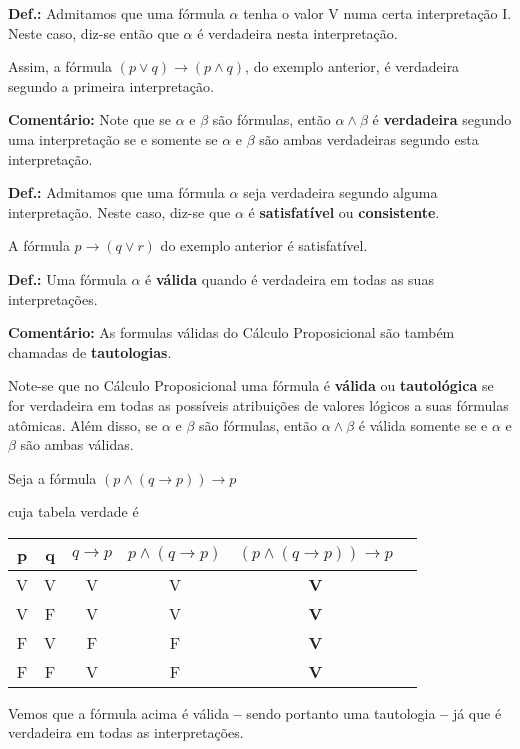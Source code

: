 \bigskip
\noindent
\textbf{Def.:} Admitamos que uma fórmula $\alpha$ tenha o valor V numa certa interpretação I.
Neste caso, diz-se então que $\alpha$ é verdadeira nesta interpretação.

Assim, a fórmula $(p \lor q) \to (p \land q)$, do exemplo anterior, é verdadeira segundo a primeira interpretação.

\bigskip
\noindent
\textbf{Comentário:} Note que se $\alpha$ e $\beta$ são fórmulas, então $\alpha \land \beta$ é \textbf{verdadeira} segundo uma interpretação se e somente se $\alpha$ e $\beta$ são ambas verdadeiras segundo esta interpretação.

\bigskip
\noindent
\textbf{Def.:} Admitamos que uma fórmula $\alpha$ seja verdadeira segundo alguma interpretação.
Neste caso, diz-se que $\alpha$ é \textbf{satisfatível} ou \textbf{consistente}.

A fórmula $p \to (q \lor r)$ do exemplo anterior é satisfatível.


\bigskip
\noindent
\textbf{Def.:} Uma fórmula $\alpha$ é \textbf{válida} quando é verdadeira em todas as suas interpretações.

\bigskip
\noindent
\textbf{Comentário:} As formulas válidas do  Cálculo Proposicional são também chamadas de \textbf{tautologias}.

Note-se que no Cálculo Proposicional uma fórmula é \textbf{válida} ou \textbf{tautológica} se for verdadeira em todas as possíveis atribuições de valores lógicos a suas fórmulas atômicas.
Além disso, se $\alpha$ e $\beta$ são fórmulas, então $\alpha \land \beta$ é válida somente se e $\alpha$ e $\beta$ são ambas válidas.

\begin{exemplo}
    Seja a fórmula $(p \land (q \to p)) \to p$
\end{exemplo}
\noindent cuja tabela verdade é

\begin{center}
    \begin{tabular}{c c c c c c}
        p & q & $q \to p$ & $p \land (q \to p)$ & $(p \land (q \to p)) \to p$ \\ \hline
        V & V & V         & V                   & \textbf{V} \\
        V & F & V         & V                   & \textbf{V} \\
        F & V & F         & F                   & \textbf{V} \\
        F & F & V         & F                   & \textbf{V}
    \end{tabular}
\end{center}
Vemos que a fórmula acima é válida \textbf{--} sendo portanto uma tautologia \textbf{--} já que é verdadeira em todas as interpretações.


